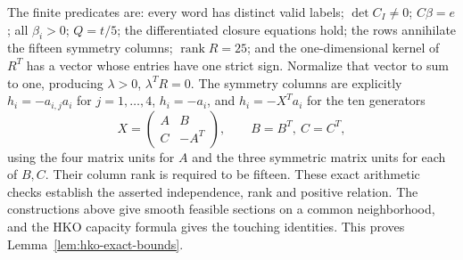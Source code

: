 The finite predicates are: every word has distinct valid labels;
$\det C_I\ne0$; $C\beta=e$; all $\beta_i>0$; $Q=t/5$;
the differentiated closure equations hold; the rows annihilate the fifteen
symmetry columns; $\operatorname{rank}R=25$; and the one-dimensional kernel
of $R^T$ has a vector whose entries have one strict sign. Normalize that
vector to sum to one, producing $\lambda>0$, $\lambda^TR=0$.
The symmetry columns are explicitly $h_i=-a_{i,j}a_i$ for $j=1,\ldots,4$,
$h_i=-a_i$, and $h_i=-X^Ta_i$ for the ten generators
\[
 X=\begin{pmatrix}A&B\\C&-A^T\end{pmatrix},\qquad B=B^T,\ C=C^T,
\]
using the four matrix units for $A$ and the three symmetric matrix units
for each of $B,C$. Their column rank is required to be fifteen.
These exact arithmetic checks establish the asserted independence, rank and
positive relation. The constructions above give smooth feasible sections
on a common neighborhood, and the HKO capacity formula gives the touching
identities. This proves Lemma~\ref{lem:hko-exact-bounds}.
